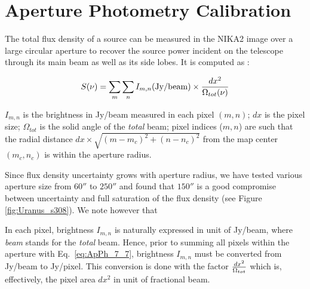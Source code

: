 \section{Aperture Photometry Calibration}%

The total flux density of a source can be measured in the NIKA2 image
over a large circular aperture to recover the source power incident on the telescope through its main
beam as well as its side lobes. It is computed as :

\begin{equation}
S(\nu) = \sum_{m} \sum_{n}  I_{m,n} ({\rm Jy/beam}) \times {dx^2 \over {\Omega_{tot}(\nu)}}
\label{eq:ApPh_7_7}
\end{equation}

\noindent  $I_{m,n}$ is the brightness in Jy/beam measured in each pixel $(m,n)$; $dx$ is the pixel size;
$\Omega_{tot}$ is the solid angle of the {\it total} beam; pixel
indices ($m,n$) are such that the radial distance $dx \times
\sqrt{(m-m_c)^2 + (n-n_c)^2}$ from the map center $(m_c,n_c)$
is within the aperture radius. 

Since flux density uncertainty grows with aperture radius, we have tested various aperture size from $60''$
to $250''$ and found that $150''$ is a good compromise between
uncertainty and full saturation of the flux density (see Figure
\ref{fig:Uranus_s308}).
We note however that 


In each pixel, brightness $I_{m,n}$ is naturally expressed in unit of
Jy/beam, where  {\it beam} stands for the {\it total} beam.
Hence, prior to summing all pixels within the aperture with
Eq.~\ref{eq:ApPh_7_7}, brightness $I_{m,n}$
must be converted from  Jy/beam to Jy/pixel. This
conversion is done with the factor $dx^2 \over {\Omega_{tot}}$
which is, effectively, the pixel area $dx^2$ in unit of fractional
beam. 


